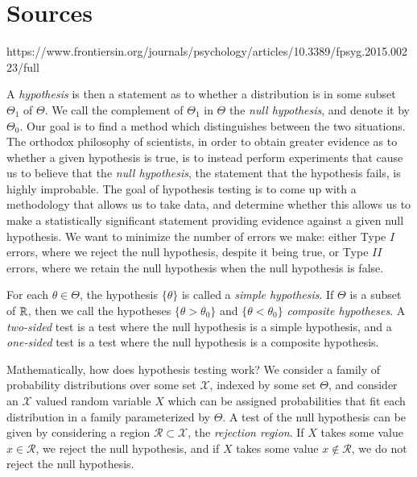 \section{Sources}

https://www.frontiersin.org/journals/psychology/articles/10.3389/fpsyg.2015.00223/full





\newpage





 A \emph{hypothesis} is then a statement as to whether a distribution is in some subset $\Theta_1$ of $\Theta$. We call the complement of $\Theta_1$ in $\Theta$ the \emph{null hypothesis}, and denote it by $\Theta_0$. Our goal is to find a method which distinguishes between the two situations. The orthodox philosophy of scientists, in order to obtain greater evidence as to whether a given hypothesis is true, is to instead perform experiments that cause us to believe that the \emph{null hypothesis}, the statement that the hypothesis fails, is highly improbable. The goal of hypothesis testing is to come up with a methodology that allows us to take data, and determine whether this allows us to make a statistically significant statement providing evidence against a given null hypothesis. We want to minimize the number of errors we make: either Type $I$ errors, where we reject the null hypothesis, despite it being true, or Type $II$ errors, where we retain the null hypothesis when the null hypothesis is false.

For each $\theta \in \Theta$, the hypothesis $\{ \theta \}$ is called a \emph{simple hypothesis}. If $\Theta$ is a subset of $\operatorname{\mathbb{R}}$, then we call the hypotheses $\{ \theta > \theta_0 \}$ and $\{ \theta < \theta_0 \}$ \emph{composite hypotheses}. A \emph{two-sided} test is a test where the null hypothesis is a simple hypothesis, and a \emph{one-sided} test is a test where the null hypothesis is a composite hypothesis.

Mathematically, how does hypothesis testing work? We consider a family of probability distributions over some set $\mathcal{X}$, indexed by some set $\Theta$, and consider an $\mathcal{X}$ valued random variable $X$ which can be assigned probabilities that fit each distribution in a family parameterized by $\Theta$. A test of the null hypothesis can be given by considering a region $\mathcal{R} \subset \mathcal{X}$, the \emph{rejection region}. If $X$ takes some value $x \in \mathcal{R}$, we reject the null hypothesis, and if $X$ takes some value $x \not \in \mathcal{R}$, we do not reject the null hypothesis. 

